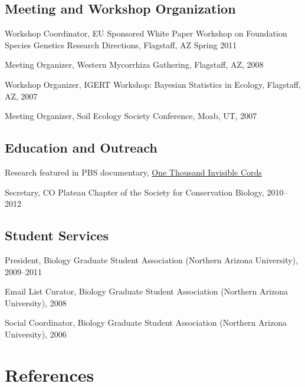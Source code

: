 \documentclass[letterpaper]{article}
\renewenvironment{itemize}{
  \begin{list}{}{
    \setlength{\leftmargin}{1em}
  }
}{
  \end{list}
}
\begin{document}
\subsection*{Meeting and Workshop Organization}
\begin{itemize}
\item Workshop Coordinator, EU Sponsored White Paper Workshop on Foundation Species Genetics Research Directions, Flagstaff, AZ Spring 2011
\item Meeting Organizer, Western Mycorrhiza Gathering, Flagstaff, AZ, 2008
\item Workshop Organizer, IGERT Workshop: Bayesian Statistics in Ecology, Flagstaff, AZ, 2007
\item Meeting Organizer, Soil Ecology Society Conference, Moab, UT, 2007
\end{itemize}

\subsection*{Education and Outreach}
\begin{itemize}
\item Research featured in PBS documentary, \href{http://nau.edu/Research/Feature-Stories/A-Thousand-Invisible-Cords/}{One Thousand Invisible Cords}
\item Secretary, CO Plateau Chapter of the Society for Conservation Biology, 2010--2012
\end{itemize}

\subsection*{Student Services}
\begin{itemize}
\item President, Biology Graduate Student Association (Northern Arizona University), 2009--2011
\item Email List Curator, Biology Graduate Student Association (Northern Arizona University), 2008
\item Social Coordinator, Biology Graduate Student Association (Northern Arizona University), 2006
\end{itemize}


\section*{References}
\end{document}
